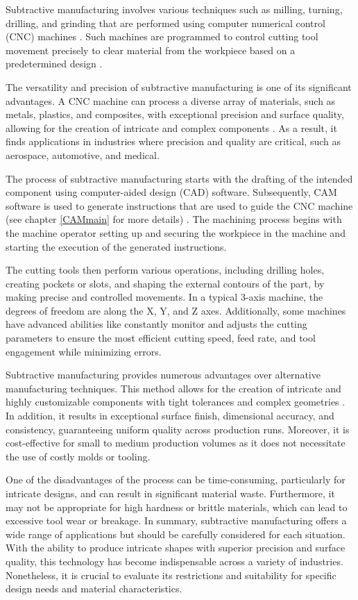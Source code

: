 Subtractive manufacturing involves various techniques such as milling, turning, drilling, and grinding that are performed using computer numerical control (CNC) machines \cite{Kumar.2020}. Such machines are programmed to control cutting tool movement precisely to clear material from the workpiece based on a predetermined design \cite{Amanullah.2017}.

The versatility and precision of subtractive manufacturing is one of its significant advantages. A CNC machine can process a diverse array of materials, such as metals, plastics, and composites, with exceptional precision and surface quality, allowing for the creation of intricate and complex components \cite{Tomaz.2021}. As a result, it finds applications in industries where precision and quality are critical, such as aerospace, automotive, and medical.

The process of subtractive manufacturing starts with the drafting of the intended component using computer-aided design (CAD) software. Subsequently, CAM software is used to generate instructions that are used to guide the CNC machine (see chapter \ref{CAMmain} for more details) . The machining process begins with the machine operator setting up and securing the workpiece in the machine and starting the execution of the generated instructions.

The cutting tools then perform various operations, including drilling holes, creating pockets or slots, and shaping the external contours of the part, by making precise and controlled movements. In a typical 3-axis machine, the degrees of freedom are along the X, Y, and Z axes. Additionally, some machines have advanced abilities like constantly monitor and adjusts the cutting parameters to ensure the most efficient cutting speed, feed rate, and tool engagement while minimizing errors.


Subtractive manufacturing provides numerous advantages over alternative manufacturing techniques. This method allows for the creation of intricate and highly customizable components with tight tolerances and complex geometries \cite{Jayawardane.2023}. In addition, it results in exceptional surface finish, dimensional accuracy, and consistency, guaranteeing uniform quality across production runs. Moreover, it is cost-effective for small to medium production volumes as it does not necessitate the use of costly molds or tooling.

One of the disadvantages of the process can be time-consuming, particularly for intricate designs, and can result in significant material waste. Furthermore, it may not be appropriate for high hardness or brittle materials, which can lead to excessive tool wear or breakage. In summary, subtractive manufacturing offers a wide range of applications but should be carefully considered for each situation. With the ability to produce intricate shapes with superior precision and surface quality, this technology has become indispensable across a variety of industries. Nonetheless, it is crucial to evaluate its restrictions and suitability for specific design needs and material characteristics.


